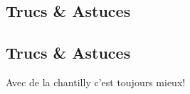     \vspace{1cm}
    \hline
    \vspace{1cm}
    
    \subsection{Trucs \& Astuces}
        \subsection{Trucs \& Astuces}
	Avec de la chantilly c'est toujours mieux!
